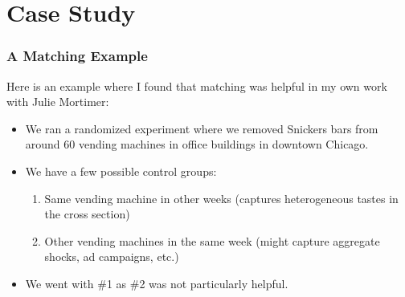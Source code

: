 \documentclass[aspectratio=169,11pt]{beamer}
\begin{document}





\section{Case Study}

\begin{frame}
\frametitle{A Matching Example}
Here is an example where I found that matching was helpful in my own work with Julie Mortimer:
\begin{itemize}
\item We ran a randomized experiment where we removed Snickers bars from around 60 vending machines in office buildings in downtown Chicago.
\item We have a few possible control groups:
\begin{enumerate}
\item Same vending machine in other weeks (captures heterogeneous tastes in the cross section)
\item Other vending machines in the same week (might capture aggregate shocks, ad campaigns, etc.)
\end{enumerate}
\item We went with \#1 as \#2 was not particularly helpful.
\end{itemize}
\end{frame}
\end{document}
